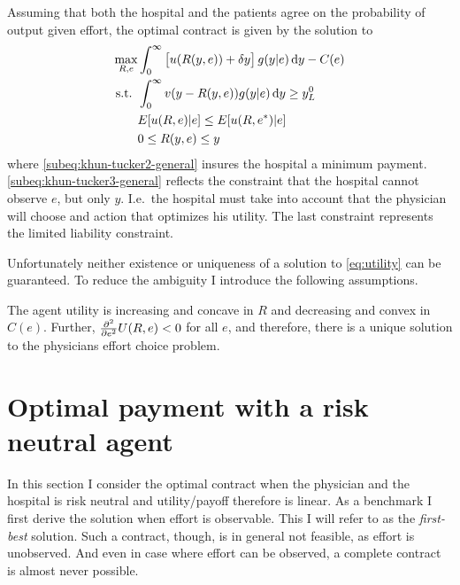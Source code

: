 Assuming that both the hospital and the patients agree on the probability of output given effort, the optimal contract is given by the solution to
\begin{subequations}
\label{eq:khun-tucker-general}
\begin{align}
    \max_{R,e} & \int_0^{\infty}\left[u(R(y,e))+\delta y\right]g(y|e)\dif y-C(e)\label{subeq:khun-tucker1-general} \\
    \text{s.t. }    & \int_{0}^{\infty} v(y-R(y,e))g(y|e)\dif y\geq y_L^0 \label{subeq:khun-tucker2-general} \\
                    & E[u(R,e)|e]\leq E[u(R,e^*)|e] \label{subeq:khun-tucker3-general}\\
                    & 0\leq R(y,e)\leq y \label{subeq:khun-tucker4-general}
\end{align}
\end{subequations}
where \cref{subeq:khun-tucker2-general} insures the hospital a minimum payment. \cref{subeq:khun-tucker3-general} reflects the constraint that the hospital cannot observe $e$, but only $y$. I.e.\ the hospital must take into account that the physician will choose and action that optimizes his utility. The last constraint represents the limited liability constraint. 

Unfortunately neither existence or uniqueness of a solution to \cref{eq:utility} can be guaranteed. To reduce the ambiguity I introduce the following assumptions. 

\begin{assumption}
\label{asump:unique-solution}
The agent utility is increasing and concave in $R$ and decreasing and convex in $C(e)$. Further, $\pder[][2]{e}U(R,e)<0$ for all $e$, and therefore, there is a unique solution to the physicians effort choice problem.
\end{assumption}



\section{Optimal payment with a risk neutral agent} %
\label{sec:optimal_payment_with_a_risk_neutral_agent}
In this section I consider the optimal contract when the physician and the hospital is risk neutral and utility/payoff therefore is linear. As a benchmark I first derive the solution when effort is observable. This I will refer to as the \emph{first-best} solution. Such a contract, though, is in general not feasible, as effort is unobserved. And even in case where effort can be observed, a complete contract is almost never possible. 

